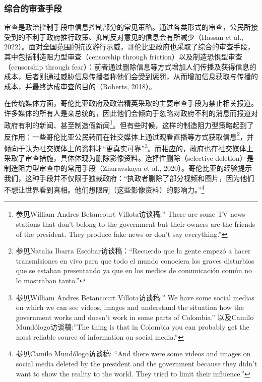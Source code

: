 \documentclass{phyasgn}\usepackage{nag}
\begin{document}
\subsubsection{综合的审查手段}
审查是政治控制手段中信息控制部分的常见策略。通过各类形式的审查，公民所接受到的不利于政府推行政策、抑制反对意见的信息会有所减少（Hassan et al., 2022）。面对全国范围的抗议游行示威，哥伦比亚政府也采取了综合的审查手段，其中包括制造阻力型审查（censorship through friction）以及制造恐惧型审查（censorship through fear）：前者通过删除信息等方式增加人们传播及获得信息的成本，后者则通过威胁信息传播者称他们会受到惩罚，从而增加信息获取与传播的成本，并最终达成审查的目的（Roberts, 2018）。
\par 在传统媒体方面，哥伦比亚政府及政治精英采取的主要审查手段为禁止相关报道。许多媒体的所有人是亲总统的，因此他们会倾向于忽略对政府不利的消息而报道对政府有利的新闻、甚至制造假新闻\footnote[49]{参见William Andres Betancourt Villota访谈稿:” There are some TV news stations that don’t belong to the government but their owners are the friends of the president. They produce fake news or don’t say everything.”}。但有些时候，这样的制造阻力型策略起到了反作用：一些哥伦比亚公民转而在社交媒体上通过观看直播等方式获取信息\footnote[50]{参见Natalia Ibarra Escobar访谈稿：“Recuerdo que la gente empezó a hacer transmisiones en vivo para que todo el mundo conociera los graves disturbios que se estaban presentando ya que en los medios de comunicación común no lo mostraban tanto.”}，并倾向于认为社交媒体上的资料才“更真实可靠”\footnote[51]{参见William Andres Betancourt Villota访谈稿:” We have some social medias on which we can see videos, images and understand the situation how the government works and doesn’t work in some parts of Colombia.” 以及Camilo Mundólogo访谈稿:”The thing is that in Colombia you can probably get the most reliable source of information on social media.”}。而相应的，政府也在社交媒体上采取了审查措施，具体体现为删除影像资料。选择性删除（selective deletion）是制造阻力型审查中的常用手段（Zhuravskaya et al., 2020）。哥伦比亚的经验提示我们，这种手段并不仅限于独裁政府：“执政者删除了部分视频和图片，因为他们不想让世界看到真相。他们想限制（这些影像资料）的影响力。”\footnote[52]{参见Camilo Mundólogo访谈稿: “And there were some videos and images on social media deleted by the president and the government because they didn’t want to show the reality to the world. They tried to limit their influence.”}
\end{document}
